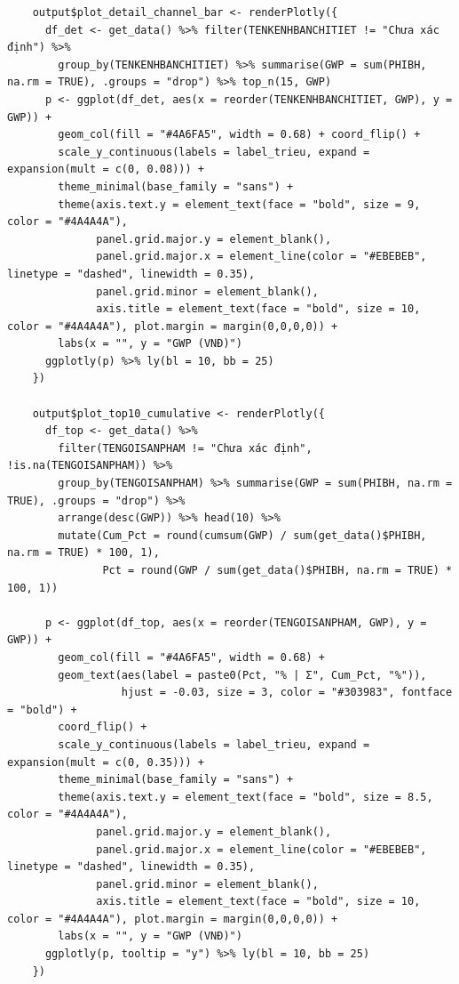 \documentclass[12pt, a4paper]{article}
\begin{document}
\begin{lstlisting}
    output$plot_detail_channel_bar <- renderPlotly({
      df_det <- get_data() %>% filter(TENKENHBANCHITIET != "Chưa xác định") %>%
        group_by(TENKENHBANCHITIET) %>% summarise(GWP = sum(PHIBH, na.rm = TRUE), .groups = "drop") %>% top_n(15, GWP)
      p <- ggplot(df_det, aes(x = reorder(TENKENHBANCHITIET, GWP), y = GWP)) +
        geom_col(fill = "#4A6FA5", width = 0.68) + coord_flip() +
        scale_y_continuous(labels = label_trieu, expand = expansion(mult = c(0, 0.08))) +
        theme_minimal(base_family = "sans") +
        theme(axis.text.y = element_text(face = "bold", size = 9, color = "#4A4A4A"),
              panel.grid.major.y = element_blank(),
              panel.grid.major.x = element_line(color = "#EBEBEB", linetype = "dashed", linewidth = 0.35),
              panel.grid.minor = element_blank(),
              axis.title = element_text(face = "bold", size = 10, color = "#4A4A4A"), plot.margin = margin(0,0,0,0)) +
        labs(x = "", y = "GWP (VNĐ)")
      ggplotly(p) %>% ly(bl = 10, bb = 25)
    })

    output$plot_top10_cumulative <- renderPlotly({
      df_top <- get_data() %>%
        filter(TENGOISANPHAM != "Chưa xác định", !is.na(TENGOISANPHAM)) %>%
        group_by(TENGOISANPHAM) %>% summarise(GWP = sum(PHIBH, na.rm = TRUE), .groups = "drop") %>%
        arrange(desc(GWP)) %>% head(10) %>%
        mutate(Cum_Pct = round(cumsum(GWP) / sum(get_data()$PHIBH, na.rm = TRUE) * 100, 1),
               Pct = round(GWP / sum(get_data()$PHIBH, na.rm = TRUE) * 100, 1))

      p <- ggplot(df_top, aes(x = reorder(TENGOISANPHAM, GWP), y = GWP)) +
        geom_col(fill = "#4A6FA5", width = 0.68) +
        geom_text(aes(label = paste0(Pct, "% | Σ", Cum_Pct, "%")),
                  hjust = -0.03, size = 3, color = "#303983", fontface = "bold") +
        coord_flip() +
        scale_y_continuous(labels = label_trieu, expand = expansion(mult = c(0, 0.35))) +
        theme_minimal(base_family = "sans") +
        theme(axis.text.y = element_text(face = "bold", size = 8.5, color = "#4A4A4A"),
              panel.grid.major.y = element_blank(),
              panel.grid.major.x = element_line(color = "#EBEBEB", linetype = "dashed", linewidth = 0.35),
              panel.grid.minor = element_blank(),
              axis.title = element_text(face = "bold", size = 10, color = "#4A4A4A"), plot.margin = margin(0,0,0,0)) +
        labs(x = "", y = "GWP (VNĐ)")
      ggplotly(p, tooltip = "y") %>% ly(bl = 10, bb = 25)
    })


\end{lstlisting}
\end{document}
